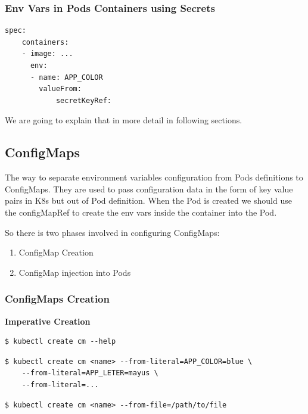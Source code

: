 \documentclass{article}
\newenvironment{codetemplate}[1][]{%
  \mybasecolorbox[#1]
  \itshape
}{%
  \endmybasecolorbox
}
\begin{document}
\subsubsection{Env Vars in Pods Containers using Secrets}
\begin{codetemplate}{}
\begin{verbatim}
spec:
    containers:
    - image: ...
      env:
      - name: APP_COLOR
        valueFrom:
            secretKeyRef:
\end{verbatim}
\end{codetemplate}

We are going to explain that in more detail in following sections.

\subsection{ConfigMaps}
The way to separate environment variables configuration from Pods definitions to ConfigMaps. They are used to pass configuration data in the form of key value pairs in K8s but out of Pod definition. When the Pod is created we should use the configMapRef to create the env vars inside the container into the Pod.

So there is two phases involved in configuring ConfigMaps:
\begin{enumerate}
    \item ConfigMap Creation
    \item ConfigMap injection into Pods
\end{enumerate}

\subsubsection{ConfigMaps Creation}

\textbf{Imperative Creation}
\begin{codetemplate}{}
\begin{verbatim}
$ kubectl create cm --help
\end{verbatim}
\end{codetemplate}

\begin{codetemplate}{}
\begin{verbatim}
$ kubectl create cm <name> --from-literal=APP_COLOR=blue \
    --from-literal=APP_LETER=mayus \
    --from-literal=...
\end{verbatim}
\end{codetemplate}

\begin{codetemplate}{}
\begin{verbatim}
$ kubectl create cm <name> --from-file=/path/to/file
\end{verbatim}
\end{codetemplate}
\end{document}
